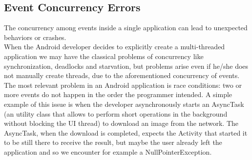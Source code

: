 \documentclass[11pt,a4paper,notitlepage]{article}
\begin{document}
\subsection{Event Concurrency Errors}
The concurrency among events inside a single application can lead to unexpected behaviors or crashes.\smallskip \\
When the Android developer decides to explicitly create a multi-threaded application we may have the classical problems of concurrency like synchronization, deadlocks and starvation, but problems arise even if he/she does not manually create threads, due to the aforementioned concurrency of events.\smallskip \\
The most relevant problem in an Android application is race conditions: two or more events do not happen in the order the programmer intended. A simple example of this issue is when the developer asynchronously starts an AsyncTask (an utility class that allows to perform short operations in the background without blocking the UI thread) to download an image from the network. The AsyncTask, when the download is completed, expects the Activity that started it to be still there to receive the result, but maybe the user already left the application and so we encounter for example a NullPointerException.
\end{document}
